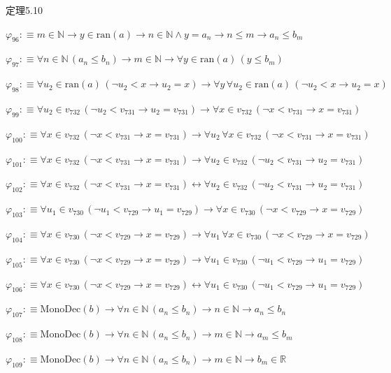 \begin{fullproof}{定理5.10}
\begin{abbrevlist}
\item $\varphi_{96} :\equiv m \in \mathbb{N} \to y \in \mathrm{ran}(a) \to n \in \mathbb{N} \land y = a_{n} \to n \leq m \to a_{n} \leq b_{m}$
\item $\varphi_{97} :\equiv \forall n \in \mathbb{N}\,(a_{n} \leq b_{n}) \to m \in \mathbb{N} \to \forall y \in \mathrm{ran}(a)\,(y \leq b_{m})$
\item $\varphi_{98} :\equiv \forall u_{2} \in \mathrm{ran}(a)\,(\neg u_{2} < x \to u_{2} = x) \to \forall y\,\forall u_{2} \in \mathrm{ran}(a)\,(\neg u_{2} < x \to u_{2} = x)$
\item $\varphi_{99} :\equiv \forall u_{2} \in v_{732}\,(\neg u_{2} < v_{731} \to u_{2} = v_{731}) \to \forall x \in v_{732}\,(\neg x < v_{731} \to x = v_{731})$
\item $\varphi_{100} :\equiv \forall x \in v_{732}\,(\neg x < v_{731} \to x = v_{731}) \to \forall u_{2}\,\forall x \in v_{732}\,(\neg x < v_{731} \to x = v_{731})$
\item $\varphi_{101} :\equiv \forall x \in v_{732}\,(\neg x < v_{731} \to x = v_{731}) \to \forall u_{2} \in v_{732}\,(\neg u_{2} < v_{731} \to u_{2} = v_{731})$
\item $\varphi_{102} :\equiv \forall x \in v_{732}\,(\neg x < v_{731} \to x = v_{731}) \leftrightarrow \forall u_{2} \in v_{732}\,(\neg u_{2} < v_{731} \to u_{2} = v_{731})$
\item $\varphi_{103} :\equiv \forall u_{1} \in v_{730}\,(\neg u_{1} < v_{729} \to u_{1} = v_{729}) \to \forall x \in v_{730}\,(\neg x < v_{729} \to x = v_{729})$
\item $\varphi_{104} :\equiv \forall x \in v_{730}\,(\neg x < v_{729} \to x = v_{729}) \to \forall u_{1}\,\forall x \in v_{730}\,(\neg x < v_{729} \to x = v_{729})$
\item $\varphi_{105} :\equiv \forall x \in v_{730}\,(\neg x < v_{729} \to x = v_{729}) \to \forall u_{1} \in v_{730}\,(\neg u_{1} < v_{729} \to u_{1} = v_{729})$
\item $\varphi_{106} :\equiv \forall x \in v_{730}\,(\neg x < v_{729} \to x = v_{729}) \leftrightarrow \forall u_{1} \in v_{730}\,(\neg u_{1} < v_{729} \to u_{1} = v_{729})$
\item $\varphi_{107} :\equiv \mathrm{MonoDec}(b) \to \forall n \in \mathbb{N}\,(a_{n} \leq b_{n}) \to n \in \mathbb{N} \to a_{n} \leq b_{n}$
\item $\varphi_{108} :\equiv \mathrm{MonoDec}(b) \to \forall n \in \mathbb{N}\,(a_{n} \leq b_{n}) \to m \in \mathbb{N} \to a_{m} \leq b_{m}$
\item $\varphi_{109} :\equiv \mathrm{MonoDec}(b) \to \forall n \in \mathbb{N}\,(a_{n} \leq b_{n}) \to m \in \mathbb{N} \to b_{m} \in \mathbb{R}$

\end{abbrevlist}
\end{fullproof}
